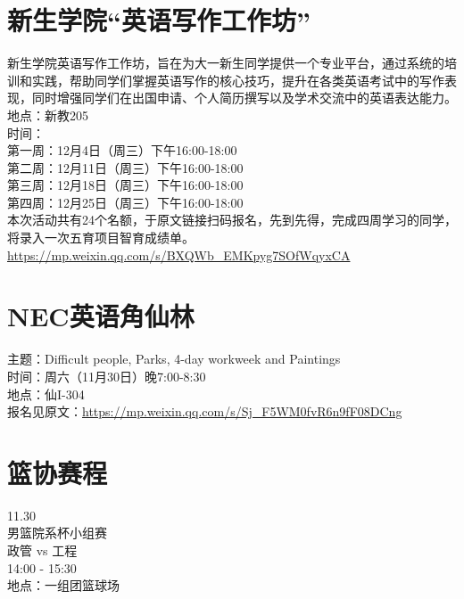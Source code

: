 \documentclass[letterpaper, 12pt]{article}
\begin{document}
\begin{multicols}{2}
\section{新生学院“英语写作工作坊”}
新生学院英语写作工作坊，旨在为大一新生同学提供一个专业平台，通过系统的培训和实践，帮助同学们掌握英语写作的核心技巧，提升在各类英语考试中的写作表现，同时增强同学们在出国申请、个人简历撰写以及学术交流中的英语表达能力。\\
地点：新教205\\
时间：\\
第一周：12月4日（周三）下午16:00-18:00\\
第二周：12月11日（周三）下午16:00-18:00\\
第三周：12月18日（周三）下午16:00-18:00\\
第四周：12月25日（周三）下午16:00-18:00\\
本次活动共有24个名额，于原文链接扫码报名，先到先得，完成四周学习的同学，将录入一次五育项目智育成绩单。\\
\url{https://mp.weixin.qq.com/s/BXQWb_EMKpyg7SOfWqyxCA}

\section{NEC英语角仙林}
主题：Difficult people, Parks, 4-day workweek and Paintings\\
时间：周六（11月30日）晚7:00-8:30\\
地点：仙I-304\\
报名见原文：\url{https://mp.weixin.qq.com/s/Sj_F5WM0fvR6n9fF08DCng}

\section{篮协赛程}
11.30\\
男篮院系杯小组赛\\
政管 vs 工程\\
14:00 - 15:30\\
地点：一组团篮球场


\end{multicols} 
\end{document}
